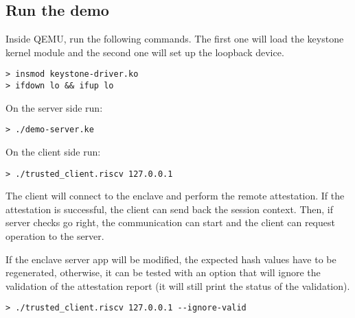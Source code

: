 \subsection{Run the demo}
Inside QEMU, run the following commands. The first one will load the keystone kernel module and the second one will set up the loopback device. \\
\begin{lstlisting}[frame=single]
> insmod keystone-driver.ko 
> ifdown lo && ifup lo           
\end{lstlisting}
On the server side run: \\
\begin{lstlisting}[frame=single]
> ./demo-server.ke         
\end{lstlisting}
On the client side run: \\
\begin{lstlisting}[frame=single]
> ./trusted_client.riscv 127.0.0.1        
\end{lstlisting}
The client will connect to the enclave and perform the remote attestation. If the attestation is successful, the client can send back the session context. Then, if server checks go right, the communication can start and the client can request operation to the server. 

If the enclave server app will be modified, the expected hash values have to be regenerated, otherwise, it can be tested with an option that will ignore the validation of the attestation report (it will still print the status of the validation). \\

\begin{lstlisting}[frame=single]
  > ./trusted_client.riscv 127.0.0.1 --ignore-valid        
\end{lstlisting}

